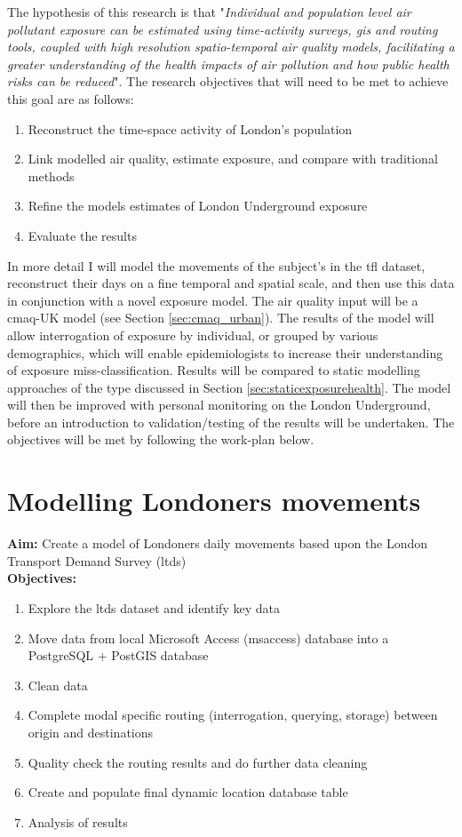 The hypothesis of this research is that "\textit{Individual and population level air pollutant exposure can be estimated using time-activity surveys, \gls{gis} and routing tools, coupled with high resolution spatio-temporal air quality models, facilitating a greater understanding of the health impacts of air pollution and how public health risks can be reduced}". The research objectives that will need to be met to achieve this goal are as follows:

\begin{enumerate}
\item Reconstruct the time-space activity of London's population
\item Link modelled air quality, estimate exposure, and compare with traditional methods
\item Refine the models estimates of London Underground exposure
\item Evaluate the results
\end{enumerate}

In more detail I will model the movements of the subject's in the \gls{tfl} dataset, reconstruct their days on a fine temporal and spatial scale, and then use this data in conjunction with a novel exposure model. The air quality input will be a \gls{cmaq}-UK model (see Section \ref{sec:cmaq_urban}). The results of the model will allow interrogation of exposure by individual, or grouped by various demographics, which will enable epidemiologists to increase their understanding of exposure miss-classification. Results will be compared to static modelling approaches of the type discussed in Section \ref{sec:staticexposurehealth}. The model will then be improved with personal monitoring on the London Underground, before an introduction to validation/testing of the results will be undertaken. The objectives will be met by following the work-plan below.

\section{Modelling Londoners movements}

\textbf{Aim:} Create a model of Londoners daily movements based upon the London Transport Demand Survey (\gls{ltds}) \\
\textbf{Objectives:}

\begin{enumerate}
\item Explore the \gls{ltds} dataset and identify key data
\item Move data from local Microsoft Access (\gls{msaccess}) database into a PostgreSQL + PostGIS database
\item Clean data
\item Complete modal specific routing (interrogation, querying, storage) between origin and destinations
\item Quality check the routing results and do further data cleaning
\item Create and populate final dynamic location database table
\item Analysis of results
\end{enumerate}

